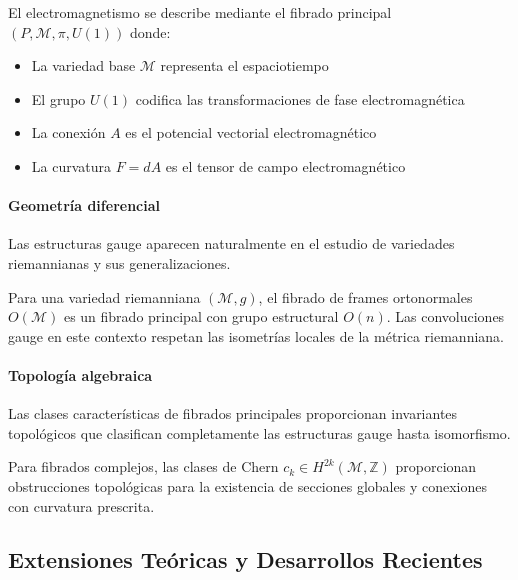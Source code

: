 \begin{example}
El electromagnetismo se describe mediante el fibrado principal $(P, \mathcal{M}, \pi, U(1))$ donde:
\begin{itemize}
\item La variedad base $\mathcal{M}$ representa el espaciotiempo
\item El grupo $U(1)$ codifica las transformaciones de fase electromagnética
\item La conexión $A$ es el potencial vectorial electromagnético
\item La curvatura $F = dA$ es el tensor de campo electromagnético
\end{itemize}
\end{example}

\paragraph{Geometría diferencial}
Las estructuras gauge aparecen naturalmente en el estudio de variedades riemannianas y sus generalizaciones.

\begin{example}
Para una variedad riemanniana $(\mathcal{M}, g)$, el fibrado de frames ortonormales $O(\mathcal{M})$ es un fibrado principal con grupo estructural $O(n)$. Las convoluciones gauge en este contexto respetan las isometrías locales de la métrica riemanniana.
\end{example}

\paragraph{Topología algebraica}
Las clases características de fibrados principales proporcionan invariantes topológicos que clasifican completamente las estructuras gauge hasta isomorfismo.

\begin{example}
Para fibrados complejos, las clases de Chern $c_k \in H^{2k}(\mathcal{M}, \mathbb{Z})$ proporcionan obstrucciones topológicas para la existencia de secciones globales y conexiones con curvatura prescrita.
\end{example}

\subsection{Extensiones Teóricas y Desarrollos Recientes}

